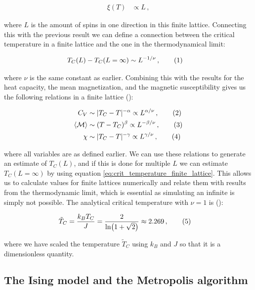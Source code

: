 \documentclass[reprint,english,notitlepage]{revtex4-1}  %
\newcommand\numberthis{\addtocounter{equation}{1}\tag{\theequation}}
\begin{document}
\begin{align*}
\xi (T) &\propto L \, ,
\end{align*}

where $L$ is the amount of spins in one direction in this finite lattice. Connecting this with the previous result we can define a connection between the critical temperature in a finite lattice and the one in the thermodynamical limit:

\begin{align*}
T_C(L) - T_C(L= \infty) &\sim L^{-1/\nu} \, , \numberthis \label{eq:crit_temperature_finite_lattice} 
\end{align*}

where $\nu$ is the same constant as earlier. Combining this with the results for the heat capacity, the mean magnetization, and the magnetic susceptibility gives us the following relations in a finite lattice (\citep[p.78]{landau_binder_2014}):

\begin{align*}
C_V &\sim |T_C - T |^{-\alpha} \propto  L^{\alpha/\nu} \, , \numberthis \label{eq:finite_lattice_heat_capacity} \\
\langle \mathcal M \rangle &\sim (T-T_C)^\beta \propto L^{-\beta /\nu} \, , \numberthis \label{eq:finite_lattice_magnetization_per_spin} \\
\chi &\sim |T_C - T|^{-\gamma} \propto L^{\gamma/\nu} \, , \numberthis \label{eq:finite_lattice_susceptibility}
\end{align*}

where all variables are as defined earlier. We can use these relations to generate an estimate of $T_C(L)$, and if this is done for multiple $L$ we can estimate $T_C(L=\infty)$ by using equation \eqref{eq:crit_temperature_finite_lattice}. This allows us to calculate values for finite lattices numerically and relate them with results from the thermodynamic limit, which is essential as simulating an infinite is simply not possible. The analytical critical temperature with $\nu=1$ is (\citep{L.Onsager1944}):

\begin{align*}
\tilde{T}_C &= \frac{k_B T_C}{J} = \frac{2}{\ln(1 + \sqrt{2})} \approx 2.269 \, , \numberthis \label{eq:crit_temperature_analytical}
\end{align*}

where we have scaled the temperature $\tilde{T}_C$ using $k_B$ and $J$ so that it is a dimensionless quantity.


\subsection{The Ising model and the Metropolis algorithm} \label{sec:II:b}
\end{document}
